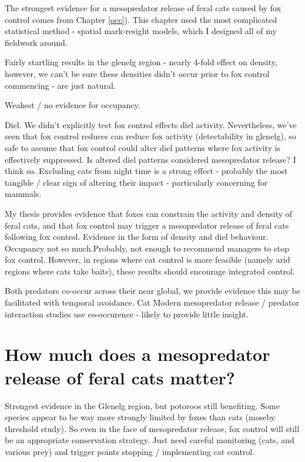 \documentclass[11pt,a4paper,titlepage,twoside,openright]{style/unimelbthesis}
\begin{document}
\begin{mainmatter}
The strongest evidence for a mesopredator release of feral cats caused by fox control comes from Chapter \ref{occ}). This chapter used the most complicated statistical method - spatial mark-resight models, which I designed all of my fieldwork around.

Fairly startling results in the glenelg region - nearly 4-fold effect on density, however, we can't be sure these densities didn't occur prior to fox control commencing - are just natural.

Weakest / no evidence for occupancy.

Diel. We didn't explicitly test fox control effects diel activity. Nevertheless, we've seen that fox control reduces can reduce fox activity (detectability in glenelg), so safe to assume that fox control could alter diel patterns where fox activity is effectively suppressed.
Is altered diel patterns considered mesopredator release? I think so. Excluding cats from night time is a strong effect - probably the most tangible / clear sign of altering their impact - particularly concerning for mammals.

My thesis provides evidence that foxes can constrain the activity and density of feral cats, and that fox control may trigger a mesopredator release of feral cats following fox control. Evidence in the form of density and diel behaviour. Occupancy not so much.Probably, not enough to recommend managers to stop fox control. However, in regions where cat control is more feasible (namely arid regions where cats take baits), these results should encourage integrated control.

Both predators co-occur across their near global, we provide evidence this may be facilitated with temporal avoidance. Cat
Modern mesopredator release / predator interaction studies use co-occurence - likely to provide little insight.

\hypertarget{how-much-does-a-mesopredator-release-of-feral-cats-matter}{%
\section{How much does a mesopredator release of feral cats matter?}\label{how-much-does-a-mesopredator-release-of-feral-cats-matter}}

Strongest evidence in the Glenelg region, but potoroos still benefiting.
Some species appear to be way more strongly limited by foxes than cats (moseby threshold study). So even in the face of mesopredator release, fox control will still be an appropriate conservation strategy. Just need careful monitoring (cats, and various prey) and trigger points stopping / implementing cat control.


\end{mainmatter}
\end{document}
